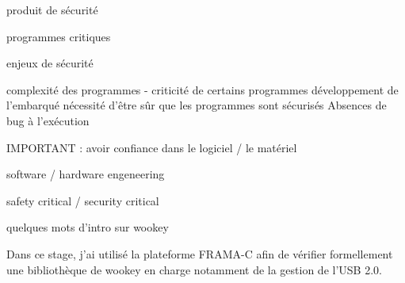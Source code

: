 produit de sécurité

programmes critiques

enjeux de sécurité


complexité des programmes - criticité de certains programmes
développement de l'embarqué
nécessité d'être sûr que les programmes sont sécurisés
Absences de bug à l'exécution

IMPORTANT : avoir confiance dans le logiciel / le matériel

software / hardware engeneering

safety critical / security critical

quelques mots d'intro sur wookey

Dans ce stage, j'ai utilisé la plateforme FRAMA-C afin de vérifier formellement une bibliothèque de wookey en charge notamment de la gestion de l'USB 2.0.
